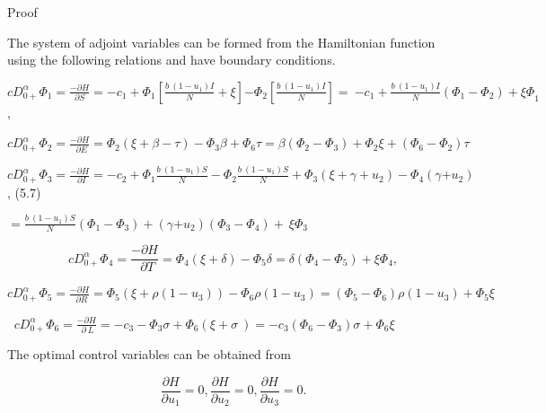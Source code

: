 \documentclass[10pt]{NSP1}
\begin{document}
Proof

The system of adjoint variables can be formed from the Hamiltonian function using the following relations and have boundary conditions.

${cD}_{0 +}^{\alpha}\Phi_{1} = \frac{- \partial H}{\partial S} = {- c}_{1} + \Phi_{1}\left\lbrack \frac{b\ \left( 1 - u_{1} \right)I}{N} + \xi \right\rbrack{- \Phi}_{2}\left\lbrack \frac{b\ \left( 1 - u_{1} \right)I}{N} \right\rbrack = \ {- c}_{1} + \frac{b\ \left( 1 - u_{1} \right)I}{N}\left( \Phi_{1} - \Phi_{2} \right) + {\xi\Phi}_{1}$,

${cD}_{0 +}^{\alpha}\Phi_{2} = \frac{- \partial H}{\ \ \partial E} = \Phi_{2}(\xi + \beta - \tau) - \Phi_{3}\beta + \Phi_{6}\tau = \beta\left( \Phi_{2} - \Phi_{3} \right) + \Phi_{2}\xi + (\Phi_{6} - \Phi_{2})\tau$

${cD}_{0 +}^{\alpha}\Phi_{3} = \frac{- \partial H}{\ \ \partial I} = - c_{2} + \Phi_{1}\frac{b\ \left( 1 - u_{1} \right)S}{N} - \Phi_{2}\frac{b\ \left( 1 - u_{1} \right)S}{N} + \Phi_{3}\left( \xi + \gamma + u_{2} \right) - \Phi_{4}(\gamma{+ u}_{2})$, (5.7)

$= \frac{b\ \left( 1 - u_{1} \right)S}{N}\left( \Phi_{1} - \Phi_{3} \right) + (\gamma{+ u}_{2})\left( \Phi_{3} - \Phi_{4} \right) + \ \xi\Phi_{3}\ $

\begin{equation}
{cD}_{0 +}^{\alpha}\Phi_{4} = \frac{- \partial H}{\ \ \partial T} = \Phi_{4}(\xi + \delta) - \Phi_{5}\delta = \delta\left( \Phi_{4} - \Phi_{5} \right) + \xi\Phi_{4},

\end{equation}

${cD}_{0 +}^{\alpha}\Phi_{5} = \frac{- \partial H}{\ \ \partial R} = \Phi_{5}\left( \xi + \rho\left( 1 - u_{3} \right) \right) - \Phi_{6}\rho\left( 1 - u_{3} \right) = \left( \Phi_{5} - \Phi_{6} \right)\rho\left( 1 - u_{3} \right) + \Phi_{5}\xi$

$\ $ ${cD}_{0 +}^{\alpha}\Phi_{6} = \frac{- \partial H}{\ \ \partial\ L\ } = - c_{3} - \Phi_{3}\sigma + \Phi_{6}(\xi + \sigma\ ) = - c_{3}\left( \Phi_{6} - \Phi_{3} \right)\sigma + \Phi_{6}\xi$

The optimal control variables can be obtained from

\begin{equation}
\frac{\partial H}{\partial u_{1}} = 0,\frac{\partial H}{\partial u_{2}} = 0,\frac{\partial H}{\partial u_{3}} = 0.

\end{equation}
\end{document}
